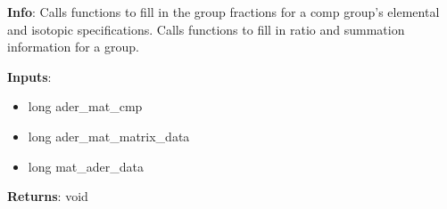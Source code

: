 \textbf{Info}: Calls functions to fill in the group fractions for a comp group's
elemental and isotopic specifications. Calls functions to fill in ratio and
summation information for a group.

\noindent \textbf{Inputs}:
\begin{itemize}
\item{long ader\_mat\_cmp}
\item{long ader\_mat\_matrix\_data}
\item{long mat\_ader\_data}
\end{itemize}

\noindent \textbf{Returns}: void

